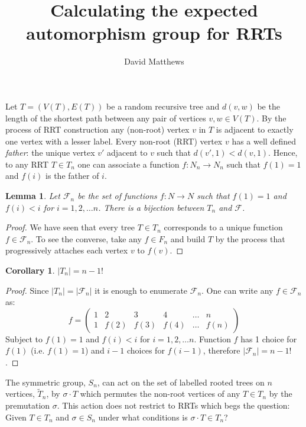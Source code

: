 \documentclass[12pt]{article} %
\title{Calculating the expected automorphism group for RRTs}
\author{David Matthews}
\newtheorem{corol}{Corollary}
\newtheorem{lem}[thm]{Lemma}
\theoremstyle{definition}
\begin{document}

Let $T = (V(T),E(T))$ be a random recursive tree and $d(v,w)$ be the length of the shortest path between any pair of vertices $v,w \in V(T)$.  By the process of RRT construction any (non-root) vertex $v$ in $T$ is adjacent to exactly one vertex with a lesser label. Every non-root (RRT) vertex $v$ has a well defined \emph{father}: the unique vertex $v'$ adjacent to $v$ such that $d(v',1)< d(v,1)$. Hence, to any RRT $T \in T_n$ one can associate a function $f: N_n \rightarrow N_n$ such that $f(1) =1$ and $f(i)$ is the father of $i$.  

\begin{lem}
 Let $\mathcal{F}_n$ be the set of functions $f: N \longrightarrow N$ such that $f(1) = 1$ and $f(i) <i$ for $i = 1,2,\dots n$.  There is a bijection between $T_n$ and $\mathcal{F}$.
\end{lem}

\begin{proof}
 We have seen that every tree $T \in T_n$ corresponds to a unique function $f \in \mathcal{F}_n$.  To see the converse, take any $f \in {F}_n$ and build $T$ by the process that progressively attaches each vertex $v$ to $f(v)$.  
\end{proof}

\begin{corol}
$\lvert T_n \rvert =  n-1!$
\end{corol}
\begin{proof}
 Since $\lvert T_n \rvert = \lvert \mathcal{F}_n \rvert$ it is enough to enumerate $\mathcal{F}_n$.  One can write any $f \in \mathcal{F}_n$ as:
 \[ f= \left(\begin{array}{cccccc}
     1& 2&3 &4& \dots & n \\
     1 & f(2) &f(3) &f(4) &\dots & f(n)
    \end{array} \right)\]
Subject to  $f(1) = 1$ and $f(i) <i$ for $i = 1,2,\dots n$. Function $f$ has 1 choice for $f(1)$ (i.e. $f(1) = 1$) and $i-1$ choices for $f(i-1)$, therefore $ \lvert \mathcal{F}_n \rvert = n-1!$. 
\end{proof}

The symmetric group, $S_n$, can act on the set of labelled rooted trees on $n$ vertices, $\tilde{T}_n$, by $\sigma \cdot T$ which permutes the non-root vertices of any $T \in T_n$ by the premutation $\sigma$.  This action does not restrict to RRTs 
which begs the question:  Given $T \in T_n$ and $\sigma \in S_n$ under what conditions is $\sigma  \cdot T \in T_n$?
\end{document}
